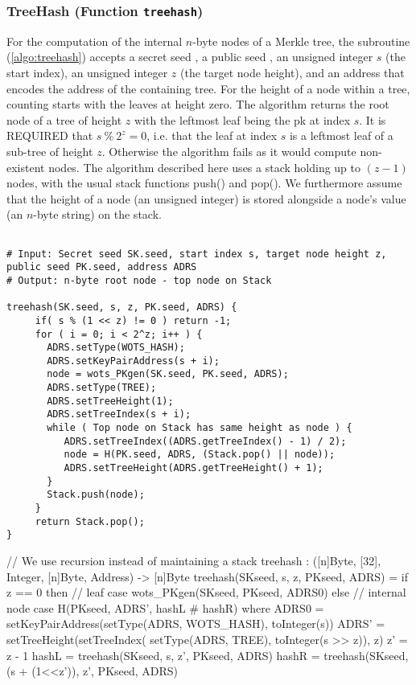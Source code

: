 \subsubsection{TreeHash (Function \texttt{treehash})}
   For the computation of the internal $n$-byte nodes of a Merkle tree,
   the subroutine \treehash (\autoref{algo:treehash}) accepts a secret seed \sseed,
   a public seed \pseed, an unsigned integer $s$ (the start index), an
   unsigned integer $z$ (the target node height), and an address \adrs that
   encodes the address of the containing tree. For the height of a node
   within a tree, counting starts with the leaves at height zero.  The
   \treehash algorithm returns the root node of a tree of height $z$ with
   the leftmost leaf being the \wotsp pk at index $s$. It is
   REQUIRED that $s\ \%\ 2^z = 0$, i.e. that the leaf at index $s$ is a
   leftmost leaf of a sub-tree of height $z$.  Otherwise the algorithm fails
   as it would compute non-existent nodes.
   The \treehash algorithm described here uses
   a stack holding up to $(z - 1)$ nodes, with the usual stack functions
   push() and pop().  We furthermore assume that the height of a node
   (an unsigned integer) is stored alongside a node's value (an $n$-byte
   string) on the stack.


   \begin{lstlisting}[breaklines=true, label=algo:treehash, language=pseudoc,
                   caption=\texttt{treehash} -- The TreeHash algorithm.]

# Input: Secret seed SK.seed, start index s, target node height z, public seed PK.seed, address ADRS
# Output: n-byte root node - top node on Stack

treehash(SK.seed, s, z, PK.seed, ADRS) {
     if( s % (1 << z) != 0 ) return -1;
     for ( i = 0; i < 2^z; i++ ) {
       ADRS.setType(WOTS_HASH);
       ADRS.setKeyPairAddress(s + i);
       node = wots_PKgen(SK.seed, PK.seed, ADRS);
       ADRS.setType(TREE);
       ADRS.setTreeHeight(1);
       ADRS.setTreeIndex(s + i);
       while ( Top node on Stack has same height as node ) {
          ADRS.setTreeIndex((ADRS.getTreeIndex() - 1) / 2);
          node = H(PK.seed, ADRS, (Stack.pop() || node));
          ADRS.setTreeHeight(ADRS.getTreeHeight() + 1);
       }
       Stack.push(node);
     }
     return Stack.pop();
}

\end{lstlisting}

\begin{code}
  // We use recursion instead of maintaining a stack
  treehash : ([n]Byte, [32], Integer, [n]Byte, Address) -> [n]Byte
  treehash(SKseed, s, z, PKseed, ADRS) =
    if z == 0 then
      // leaf case
      wots_PKgen(SKseed, PKseed, ADRS0)
    else
      // internal node case
      H(PKseed, ADRS', hashL # hashR)
    where
      ADRS0 = setKeyPairAddress(setType(ADRS, WOTS_HASH), toInteger(s))
      ADRS' = setTreeHeight(setTreeIndex(
          setType(ADRS, TREE), toInteger(s >> z)), z)
      z' = z - 1
      hashL = treehash(SKseed, s, z', PKseed, ADRS)
      hashR = treehash(SKseed, (s + (1<<z')), z', PKseed, ADRS)
\end{code}

